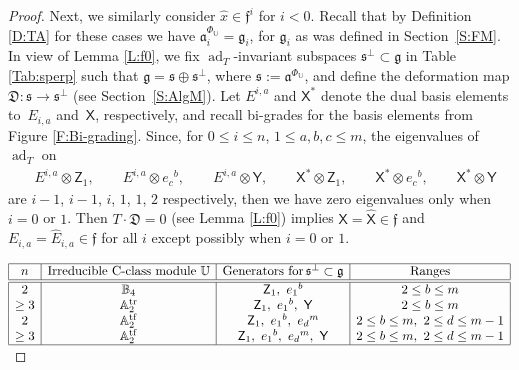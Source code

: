 \documentclass[pdftex]{sigma}%
\newcommand\tensor{\otimes}
\DeclareMathOperator{\tf}{tf}
\DeclareMathOperator{\tr}{tr}
\newcommand\fD{\mathfrak{D}}
\newcommand{\g}{\mathfrak{g}}
\newcommand\ad{\operatorname{ad}}
\newcommand\fa{\mathfrak{a}}
\newcommand\ff{\mathfrak{f}}
\newcommand\fs{\mathfrak{s}}
\newcommand\bbU{\mathbb{U}}
\newcommand\bbA{\mathbb{A}}
\newcommand\bbB{\mathbb{B}}
\newcommand\sfX{\mathsf{X}}
\newcommand\sfY{\mathsf{Y}}
\newcommand\sfZ{\mathsf{Z}}
\numberwithin{equation}{section}
\begin{document}
\begin{proof}
Next, we similarly consider $\widehat{x} \in \ff^i$ for $i <0$. Recall that by Definition \ref{D:TA} for these cases we have $\fa^{\Phi_\bbU}_i = \g_i$, for $\g_i$ as was defined in Section~\ref{S:FM}. In view of Lemma \ref{L:f0}, we fix $\ad_T$-invariant subspaces $\fs^\perp \subset \g$ in Table \ref{Tab:sperp} such that $\g = \fs \oplus \fs^\perp$, where $\fs := \fa^{\Phi_\bbU}$, and define the deformation map $\fD\colon \fs \to \fs^\perp$ (see Section~\ref{S:AlgM}). Let $E^{i,a}$ and $\sfX^\ast$ denote the dual basis elements to~$E_{i,a}$ and~$\sfX$, respectively, and recall bi-grades for the basis elements from Figure \ref{F:Bi-grading}. Since, for $0 \le i \le n$, $1 \le a,b,c \le m$, the eigenvalues of $\ad_T$ on
\begin{align}\label{jac}
&E^{i,a} \tensor \sfZ_1, \qquad E^{i,a} \tensor e_c{}^b,\qquad E^{i,a} \tensor \sfY, \qquad \sfX^\ast \tensor \sfZ_1,\qquad \sfX^\ast \tensor e_c{}^b,\qquad \sfX^\ast \tensor \sfY
\end{align}
are $i-1$, $i-1$, $i$, $1$, $1$, $2$ respectively, then we have zero eigenvalues only when $i=0$ or $1$. Then $T \cdot \fD = 0$ (see Lemma \ref{L:f0}) implies $\sfX =\widehat{\sfX} \in \ff$ and $E_{i,a} = \widehat{E}_{i,a} \in \ff $ for all $i$ except possibly when $i=0$ or $1$.
\begin{table}[ht!]\renewcommand{\arraystretch}{1.2}
\centering
$\begin{array}{|c|c|c|c|} \hline
n & \text{Irreducible C-class module } \bbU & \text{Generators for}\,\fs^\perp \subset \g & \text{Ranges}\\ \hline\hline
2 & \bbB_4 & \sfZ_1, \ e_1{}^b & 2 \le b \le m \\
\ge 3 & \bbA_2^{\tr}&\sfZ_1, \ e_1{}^b, \ \sfY & 2 \le b \le m \\
2 & \bbA_2^{\tf} &
\sfZ_1, \ e_1{}^b, \ e_d{}^m & 2 \le b \le m,\ 2 \le d \le m-1 \\
\ge 3 & \bbA_2^{\tf}&\sfZ_1,\ e_1{}^b, \ e_d{}^m, \ \sfY & 2 \le b \le m,\ 2 \le d \le m-1\\ \hline
\end{array}$
\caption{$\ad_T$-invariant subspace $\fs^\perp \subset \g$ complementary to $\fs=\fa^{\Phi_{\bbU}}$.}
\label{Tab:sperp}
\end{table}	


\end{proof}
\end{document}
